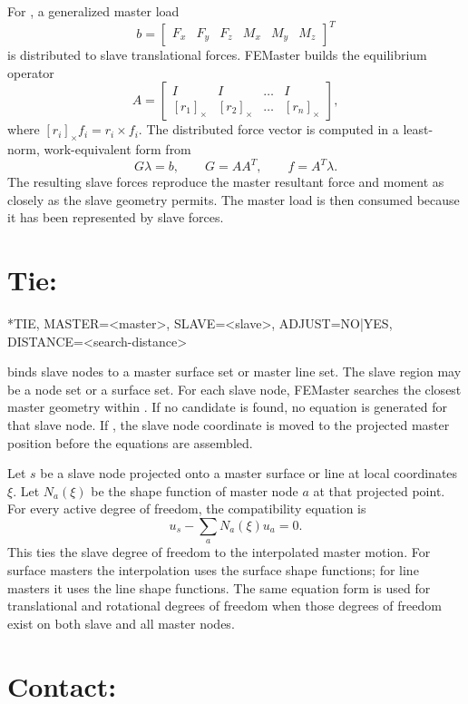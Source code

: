 For , a generalized master load
\[
b =
\begin{bmatrix}
F_x & F_y & F_z & M_x & M_y & M_z
\end{bmatrix}^T
\]
is distributed to slave translational forces. FEMaster builds the equilibrium operator
\[
A =
\begin{bmatrix}
I & I & \dots & I \\
[r_1]_\times & [r_2]_\times & \dots & [r_n]_\times
\end{bmatrix},
\]
where \([r_i]_\times f_i = r_i \times f_i\). The distributed force vector is computed in a least-norm, work-equivalent form from
\[
G \lambda = b,\qquad G = A A^T,\qquad f = A^T \lambda .
\]
The resulting slave forces reproduce the master resultant force and moment as closely as the slave geometry permits. The master load is then consumed because it has been represented by slave forces.

\section{Tie: }

\begin{syntax}
*TIE, MASTER=<master>, SLAVE=<slave>, ADJUST=NO|YES, DISTANCE=<search-distance>
\end{syntax}

 binds slave nodes to a master surface set or master line set. The slave region may be a node set or a surface set. For each slave node, FEMaster searches the closest master geometry within . If no candidate is found, no equation is generated for that slave node. If , the slave node coordinate is moved to the projected master position before the equations are assembled.

Let \(s\) be a slave node projected onto a master surface or line at local coordinates \(\xi\). Let \(N_a(\xi)\) be the shape function of master node \(a\) at that projected point. For every active degree of freedom, the compatibility equation is
\[
u_s - \sum_a N_a(\xi) u_a = 0 .
\]
This ties the slave degree of freedom to the interpolated master motion. For surface masters the interpolation uses the surface shape functions; for line masters it uses the line shape functions. The same equation form is used for translational and rotational degrees of freedom when those degrees of freedom exist on both slave and all master nodes.

\section{Contact: }

